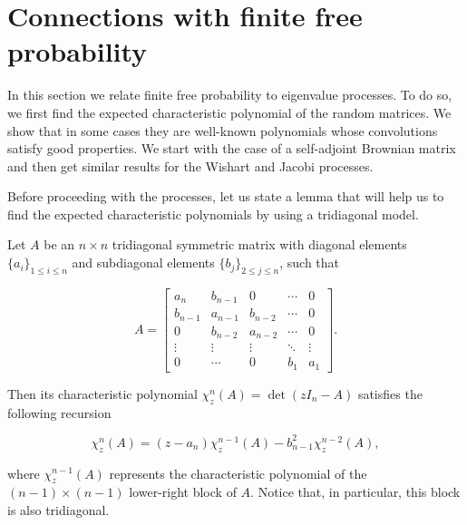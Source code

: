 \section{Connections with finite free probability}

In this section we relate finite free probability to eigenvalue processes. To do so, we first find the expected characteristic polynomial of the random matrices. We show that in some cases they are well-known polynomials whose convolutions satisfy good properties. We start with the case of a self-adjoint Brownian matrix and then get similar results for the Wishart and Jacobi processes.

Before proceeding with the processes, let us state a lemma that will help us to find the expected characteristic polynomials by using a tridiagonal model.

\begin{lemma} \label{lemma:chpol_tridiag}
    Let $A$ be an $n\times n$ tridiagonal symmetric matrix with diagonal elements $\{a_i\}_{1\le i \le n}$ and subdiagonal elements $\{ b_j \}_{2 \le j \le n}$, such that

    \begin{equation*}
        A = \begin{bmatrix}
            a_n   & b_{n-1} & 0     & \cdots & 0 \\ 
            b_{n-1} & a_{n-1}   & b_{n-2} & \cdots & 0 \\
            0     & b_{n-2} & a_{n-2}  & \cdots & 0 \\
            \vdots & \vdots & \vdots & \ddots & \vdots \\ 
            0      & \cdots & 0      & b_1 & a_1 
        \end{bmatrix}.
    \end{equation*}
    
    
    Then its characteristic polynomial $\chi^n_z(A) = \det(zI_n - A)$ satisfies the following recursion

    \begin{equation*}
        \chi^n_z(A) = (z-a_n)\chi^{n-1}_z(A) - b_{n-1}^2\chi^{n-2}_z(A), \label{eq:recursion}
    \end{equation*}

    \noindent where $\chi_z^{n-1}(A)$ represents the characteristic polynomial of the $(n-1)\times(n-1)$ lower-right block of $A$. Notice that, in particular, this block is also tridiagonal.
\end{lemma}

